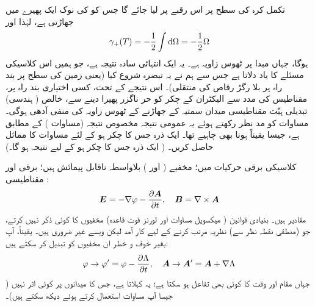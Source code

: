 تکمل کرہ کی سطح پر اس رقبے پر لیا جائے گا جس کو  کی  نوک  ایک پھیرے  میں  جھاڑتی  ہے،   لہٰذا   اور 
\begin{align}\label{مساوات_حر_عمومی_نتیجہ}
\gamma_{+} (T) = - \frac{1}{2} \int \dif \Omega = - \frac{1}{2} \Omega
\end{align}
ہوگا، جہاں مبدا  پر ٹھوس زاویہ  ہے۔  یہ ایک انتہائی سادہ نتیجہ ہے،  جو ہمیں اس کلاسیکی مسئلے  کا یاد دلاتا ہے جس سے ہم نے یہ تبصرہ شروع کیا  (یعنی زمین کی سطح پر  بند راہ پر   بلا رگڑ   رقاص   کی منتقلی)۔  اس نتیجے کے تحت،  کسی اختیاری بند راہ پر،   مقناطیس کی مدد سے الیکٹران کے چکر کو حر ناگزر  پھیرا دینے سے،  خالص ( ہندسی) تبدیلی ہیّت مقناطیسی میدان سمتیہ کے جھاڑنے کے  ٹھوس زاویہ کی منفی آدھی   ہوگی۔  مساوات    کو مد نظر رکھتے ہوئے یہ عمومی نتیجہ   مخصوص نتیجہ   (مساوات )   کے مطابق ہے،  جیسا یقیناً ہونا بھی چاہیے  تھا۔
ایک ذرہ جس کا چکر    ہو کے لئے مساوات    کا مماثل حاصل کریں۔    ( ایک ذرہ جس کا چکر  ہو کے لیے نتیجہ   ہو گا۔)




کلاسیکی برقی حرکیات میں؛ مخفیے  (  اور )  بلاواسطہ ناقابل پیمائش ہیں؛   برقی اور مقناطیسی  : 
\begin{align}\label{مساوات_حر_طبیعی_میدان}
{\ensuremath{{\boldsymbol{E}}}} = - \nabla \varphi - \frac{\partial {\ensuremath{{\boldsymbol{A}}}}}{\partial t}, \quad {\ensuremath{{\boldsymbol{B}}}} = \nabla \times {\ensuremath{{\boldsymbol{A}}}}
\end{align}
  مقادیر ہیں۔   بنیادی قوانین ( میکسویل مساوات اور لورنز  قوت  قاعدہ) مخفیوں  کا کوئی ذکر نہیں کرتے،  جو  (منطقی نقطہ نظر سے)  نظریہ  مرتب کرنے  کے لیے کار آمد لیکن ویسے غیر ضروری ہیں۔  یقیناً، آپ  بغیر  خوف  و خطر ان مخفیوں  کو تبدیل کر سکتے ہیں: 
\begin{align}
\varphi \to \varphi' = \varphi - \frac{\partial \Lambda}{\partial t}, \quad {\ensuremath{{\boldsymbol{A}}}} \to {\ensuremath{{\boldsymbol{A}}}}' = {{\boldsymbol{A}}} + \nabla \Lambda
\end{align}
جہاں  مقام اور وقت کا کوئی بھی تفاعل ہو سکتا ہے؛  یہ    کہلاتا  ہے،   جس کا میدانوں پر کوئی اثر نہیں    ( جیسا آپ مساوات    استعمال کرتے ہوئے   دیکھ سکتے ہیں)۔ 

